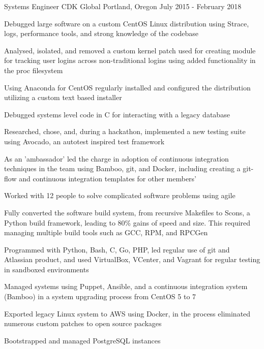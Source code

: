 \begin{cventries}
  \cventry
    {Systems Engineer} %
    {CDK Global} %
    {Portland, Oregon} %
    {July 2015 - February 2018} %
    {
      \begin{cvitems} %
        \item {Debugged large software on a custom CentOS Linux distribution using Strace, logs, performance tools, and strong knowledge of the codebase}
        \item {Analysed, isolated, and removed a custom kernel patch used for creating module for tracking user logins across non-traditional logins using added functionality in the proc filesystem}
        \item {Using Anaconda for CentOS regularly installed and configured the distribution utilizing a custom text based installer}
        \item {Debugged systems level code in C for interacting with a legacy database}
        \item {Researched, chose, and, during a hackathon, implemented a new testing suite using Avocado, an autotest inspired test framework}
        \item {As an 'ambassador' led the charge in adoption of continuous integration techniques in the team using Bamboo, git, and Docker, including creating a git-flow and continuous integration templates for other members}'
        \item {Worked with 12 people to solve complicated software problems using agile}
        \item {Fully converted the software build system, from recursive Makefiles to Scons, a Python build framework, leading to 80\% gains of speed and size. This required managing multiple build tools such as GCC, RPM, and RPCGen}
        \item {Programmed with Python, Bash, C, Go, PHP, led regular use of git and Atlassian product, and used VirtualBox, VCenter, and Vagrant for regular testing in sandboxed environments}
        \item {Managed systems using Puppet, Ansible, and a continuous integration system (Bamboo) in a system upgrading process from CentOS 5 to 7}
        \item {Exported legacy Linux system to AWS using Docker, in the process eliminated numerous custom patches to open source packages}
        \item {Bootstrapped and managed PostgreSQL instances}
      \end{cvitems}
    }


\end{cventries}
